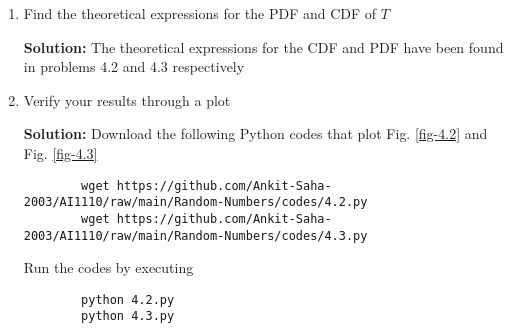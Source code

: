 \documentclass[journal,12pt,twocolumn]{IEEEtran}
\newcommand{\solution}{\noindent \textbf{Solution: }}
\numberwithin{equation}{section}
\renewcommand\thesection{\arabic{section}}
\begin{document}
\begin{enumerate}[label=\thesection.\arabic*,ref=\thesection.\theenumi]
	\item Find the theoretical expressions for the PDF and CDF of $T$
	
	\solution The theoretical expressions for the CDF and PDF have been found in problems 4.2 and 4.3 respectively

	\item Verify your results through a plot
	
	\solution Download the following Python codes that plot Fig. \ref{fig-4.2} and Fig. \ref{fig-4.3}
	\begin{lstlisting}
		wget https://github.com/Ankit-Saha-2003/AI1110/raw/main/Random-Numbers/codes/4.2.py
		wget https://github.com/Ankit-Saha-2003/AI1110/raw/main/Random-Numbers/codes/4.3.py
	\end{lstlisting}
	Run the codes by executing
	\begin{lstlisting}
		python 4.2.py
		python 4.3.py
	\end{lstlisting}
	
	
	\end{enumerate}
\end{document}
